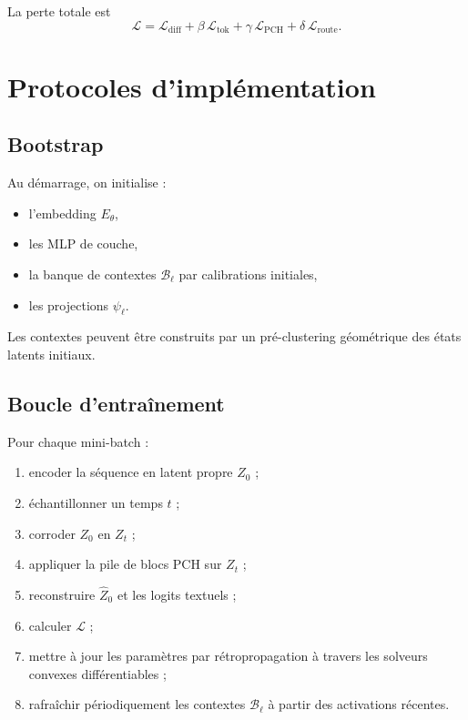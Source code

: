 \documentclass[11pt]{article}
\begin{document}
La perte totale est
\[
\mathcal L
=
\mathcal L_{\mathrm{diff}}
+
\beta\,\mathcal L_{\mathrm{tok}}
+
\gamma\,\mathcal L_{\mathrm{PCH}}
+
\delta\,\mathcal L_{\mathrm{route}}.
\]

\section{Protocoles d'implémentation}

\subsection{Bootstrap}

Au démarrage, on initialise :
\begin{itemize}[leftmargin=2em]
    \item l'embedding \(E_\theta\),
    \item les MLP de couche,
    \item la banque de contextes \(\mathcal B_\ell\) par calibrations initiales,
    \item les projections \(\psi_\ell\).
\end{itemize}

Les contextes peuvent être construits par un pré-clustering géométrique des états latents initiaux.

\subsection{Boucle d'entraînement}

Pour chaque mini-batch :
\begin{enumerate}[leftmargin=2em]
    \item encoder la séquence en latent propre \(Z_0\) ;
    \item échantillonner un temps \(t\) ;
    \item corroder \(Z_0\) en \(Z_t\) ;
    \item appliquer la pile de blocs PCH sur \(Z_t\) ;
    \item reconstruire \(\widehat Z_0\) et les logits textuels ;
    \item calculer \(\mathcal L\) ;
    \item mettre à jour les paramètres par rétropropagation à travers les solveurs convexes différentiables ;
    \item rafraîchir périodiquement les contextes \(\mathcal B_\ell\) à partir des activations récentes.
\end{enumerate}
\end{document}
